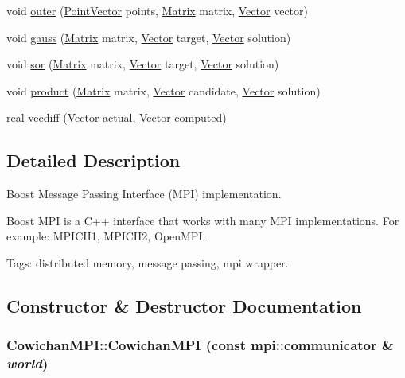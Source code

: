 \begin{CompactItemize}
void \hyperlink{class_cowichan_m_p_i_39fcc8a331b0e26438fbf43fa01cf7c1}{outer} (\hyperlink{class_point}{PointVector} points, \hyperlink{cowichan_8hpp_3fb46f939e55c239fbc95656fc0f3399}{Matrix} matrix, \hyperlink{cowichan_8hpp_02bc1553e241b9b33408482658b3c355}{Vector} vector)
\item 
void \hyperlink{class_cowichan_m_p_i_975f8da6c166fe1db3cf9341eeaab000}{gauss} (\hyperlink{cowichan_8hpp_3fb46f939e55c239fbc95656fc0f3399}{Matrix} matrix, \hyperlink{cowichan_8hpp_02bc1553e241b9b33408482658b3c355}{Vector} target, \hyperlink{cowichan_8hpp_02bc1553e241b9b33408482658b3c355}{Vector} solution)
\item 
void \hyperlink{class_cowichan_m_p_i_7388c844e8aa73ab0923443a3a7ef069}{sor} (\hyperlink{cowichan_8hpp_3fb46f939e55c239fbc95656fc0f3399}{Matrix} matrix, \hyperlink{cowichan_8hpp_02bc1553e241b9b33408482658b3c355}{Vector} target, \hyperlink{cowichan_8hpp_02bc1553e241b9b33408482658b3c355}{Vector} solution)
\item 
void \hyperlink{class_cowichan_m_p_i_1b7dccf774caccb26839cd29fe0a5cb0}{product} (\hyperlink{cowichan_8hpp_3fb46f939e55c239fbc95656fc0f3399}{Matrix} matrix, \hyperlink{cowichan_8hpp_02bc1553e241b9b33408482658b3c355}{Vector} candidate, \hyperlink{cowichan_8hpp_02bc1553e241b9b33408482658b3c355}{Vector} solution)
\item 
\hyperlink{cowichan_8hpp_4d521b2c54a1f6312cc8fa04827eaf98}{real} \hyperlink{class_cowichan_m_p_i_c5470a2876efecf843b19c37c21ecf19}{vecdiff} (\hyperlink{cowichan_8hpp_02bc1553e241b9b33408482658b3c355}{Vector} actual, \hyperlink{cowichan_8hpp_02bc1553e241b9b33408482658b3c355}{Vector} computed)
\end{CompactItemize}


\subsection{Detailed Description}
Boost Message Passing Interface (MPI) implementation. 

Boost MPI is a C++ interface that works with many MPI implementations. For example: MPICH1, MPICH2, OpenMPI.

Tags: distributed memory, message passing, mpi wrapper. 

\subsection{Constructor \& Destructor Documentation}
\hypertarget{class_cowichan_m_p_i_ba4175b1aadbab75285b47819477dedf}{
\subsubsection[{CowichanMPI}]{\setlength{\rightskip}{0pt plus 5cm}CowichanMPI::CowichanMPI (const mpi::communicator \& {\em world})}}
\label{class_cowichan_m_p_i_ba4175b1aadbab75285b47819477dedf}


